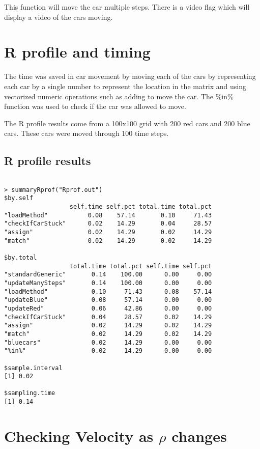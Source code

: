 \documentclass[11pt]{article}
\begin{document}
    This function will move the car multiple steps.  There is a video
    flag which will display a video of the cars moving.
\section{R profile and timing}
\label{sec-2}

  The time was saved in car movement by moving each of the cars by
  representing each car by a single number to represent the location
  in the matrix and using vectorized numeric operations such as adding
  to move the car.  The \%in\% function was used to check if the car was
  allowed to move.

  The R profile results come from a 100x100 grid with 200 red cars and
  200 blue cars.  These cars were moved through 100 time steps.
\subsection{R profile results}
\label{sec-2-1}


\begin{verbatim}

> summaryRprof("Rprof.out")
$by.self
                  self.time self.pct total.time total.pct
"loadMethod"           0.08    57.14       0.10     71.43
"checkIfCarStuck"      0.02    14.29       0.04     28.57
"assign"               0.02    14.29       0.02     14.29
"match"                0.02    14.29       0.02     14.29

$by.total
                  total.time total.pct self.time self.pct
"standardGeneric"       0.14    100.00      0.00     0.00
"updateManySteps"       0.14    100.00      0.00     0.00
"loadMethod"            0.10     71.43      0.08    57.14
"updateBlue"            0.08     57.14      0.00     0.00
"updateRed"             0.06     42.86      0.00     0.00
"checkIfCarStuck"       0.04     28.57      0.02    14.29
"assign"                0.02     14.29      0.02    14.29
"match"                 0.02     14.29      0.02    14.29
"bluecars"              0.02     14.29      0.00     0.00
"%in%"                  0.02     14.29      0.00     0.00

$sample.interval
[1] 0.02

$sampling.time
[1] 0.14
\end{verbatim}
\section{Checking Velocity as $\rho$ changes}
\label{sec-3}
\end{document}
